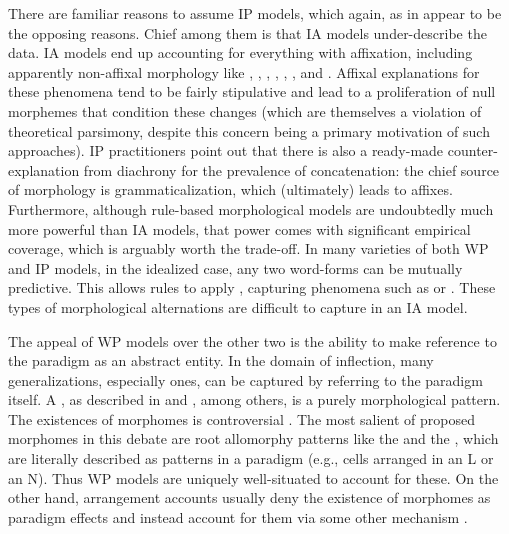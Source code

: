 \documentclass[output=paper,hidelinks]{langscibook}
\begin{document}
There are familiar reasons to assume IP models, which again, as in
 appear to be the opposing reasons.
Chief among them is that IA models under-describe the data.  IA models
end up accounting for everything with affixation, including apparently
non-affixal morphology like ,
, , ,
, , and .
Affixal explanations for these phenomena tend to be fairly stipulative
and lead to a proliferation of null morphemes that condition these
changes (which are themselves a violation of theoretical parsimony,
despite this concern being a primary motivation of such approaches).
IP practitioners point out that there is also a ready-made
counter-explanation from diachrony for the prevalence of
concatenation: the chief source of morphology is grammaticalization,
which (ultimately) leads to affixes.  Furthermore, although rule-based
morphological models are undoubtedly much more powerful than IA
models, that power comes with significant empirical coverage, which is
arguably worth the trade-off.  In many varieties of both WP and IP
models, in the idealized case, any two word-forms can be mutually
predictive.  This allows rules to apply , capturing
phenomena such as  or 
\citep[see, e.g.,][]{Becker1993}.  These types of morphological
alternations are difficult to capture in an IA model. 

The appeal of WP models over the other two is the ability to make
reference to the paradigm as an abstract entity.  In the domain of
inflection, many generalizations, especially  ones,
can be captured by referring to the paradigm itself. A
, as described in \citet{aronoff94} and
\citet{luis;bermudez16-book}, among others, is a purely morphological
pattern. The existences of morphomes is controversial \citep[a debate
captured well in][]{luis;bermudez16-book}. The most salient of
proposed morphomes in this debate are root allomorphy patterns like
the  and the 
\citep[see][]{maiden18}, which
are literally described as patterns in
a paradigm (e.g., cells arranged in an L or an N). Thus WP models are
uniquely well-situated to account for these. On the other hand,
arrangement accounts usually deny the existence of morphomes as
paradigm effects and instead account for them via some other mechanism
\citep[see][]{trommer16}.
\end{document}
